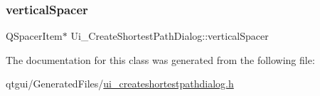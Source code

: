 \mbox{\label{class_ui___create_shortest_path_dialog_a65d48afb0d832a1ddc306dd1787b32e2}} 
\subsubsection{\texorpdfstring{verticalSpacer}{verticalSpacer}}
{\footnotesize\ttfamily Q\+Spacer\+Item$\ast$ Ui\+\_\+\+Create\+Shortest\+Path\+Dialog\+::vertical\+Spacer}



The documentation for this class was generated from the following file\+:\begin{DoxyCompactItemize}
\item 
qtgui/\+Generated\+Files/\mbox{\hyperlink{ui__createshortestpathdialog_8h}{ui\+\_\+createshortestpathdialog.\+h}}\end{DoxyCompactItemize}
